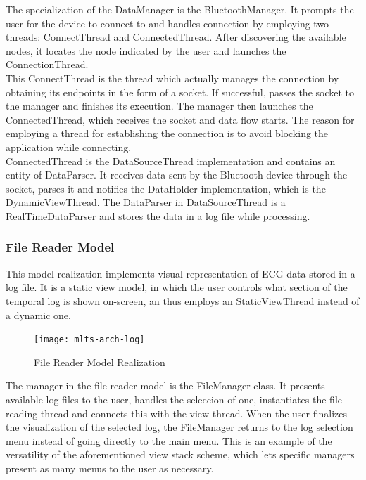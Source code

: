 			The specialization of the DataManager is the BluetoothManager. It prompts the user for the device to connect to and handles connection by employing two threads: ConnectThread and ConnectedThread. After discovering the available nodes, it locates the node indicated by the user and launches the ConnectionThread.\\

			This ConnectThread is the thread which actually manages the connection by obtaining its endpoints in the form of a socket. If successful, passes the socket to the manager and finishes its execution. The manager then launches the ConnectedThread, which receives the socket and data flow starts. The reason for employing a thread for establishing the connection is to avoid blocking the application while connecting.\\

			ConnectedThread is the DataSourceThread implementation and contains an entity of DataParser. It receives data sent by the Bluetooth device through the socket, parses it and notifies the DataHolder implementation, which is the DynamicViewThread. The DataParser in DataSourceThread is a RealTimeDataParser and stores the data in a log file while processing.

		\subsubsection{File Reader Model}
			This model realization implements visual representation of ECG data stored in a log file. It is a static view model, in which the user controls what section of the temporal log is shown on-screen, an thus employs an StaticViewThread instead of a dynamic one.\\

			\begin{figure}[h]
			\centering
		    	\texttt{[image: mlts-arch-log]}
	  		\caption{File Reader Model Realization}
			\label{fig:arch-log}
			\end{figure}
		
			The manager in the file reader model is the FileManager class. It presents available log files to the user, handles the seleccion of one, instantiates the file reading thread and connects this with the view thread. When the user finalizes the visualization of the selected log, the FileManager returns to the log selection menu instead of going directly to the main menu. This is an example of the versatility of the aforementioned view stack scheme, which lets specific managers present as many menus to the user as necessary.\\

